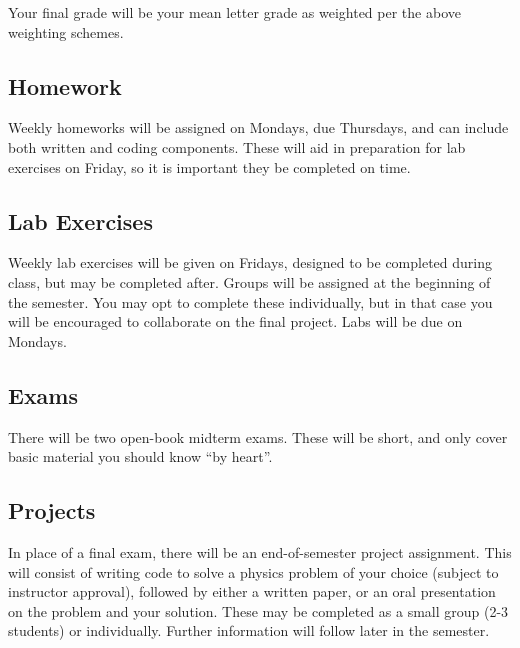 \documentclass[11pt]{article}
\begin{document}
Your final grade will be your mean letter grade as weighted per the above weighting schemes.

\subsection*{Homework}
Weekly homeworks will be assigned on Mondays, due Thursdays, and can include both written and coding components.
These will aid in preparation for lab exercises on Friday, so it is important they be completed on time.
\subsection*{Lab Exercises}
Weekly lab exercises will be given on Fridays, designed to be completed during class, but may be completed after.
Groups will be assigned at the beginning of the semester. You may opt to complete these individually, but in that
case you will be encouraged to collaborate on the final project. Labs will be due on Mondays.
\subsection*{Exams}
There will be two open-book midterm exams. These will be short, and only
cover basic material you should know ``by heart''.
\subsection*{Projects}
In place of a final exam, there will be an end-of-semester project assignment.
This will consist of writing code to solve a physics problem of your choice
(subject to instructor approval), followed by either a written paper, or
an oral presentation on the problem and your solution. These may be completed
as a small group (2-3 students) or individually. Further information will follow
later in the semester.
\end{document}
